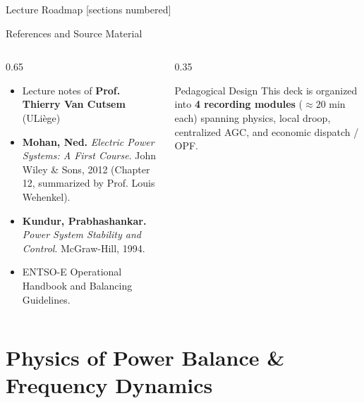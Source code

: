 
\titleframe

\begin{frame}{Lecture Roadmap}
  [sections numbered]
  \tableofcontents[hideallsubsections]
\end{frame}

\begin{frame}{References and Source Material}
\begin{columns}[T]
\begin{column}{0.65\textwidth}
    \begin{itemize}\setlength{\itemsep}{4pt}
      \item Lecture notes of \textbf{Prof. Thierry Van Cutsem} (ULiège)
      \item \textbf{Mohan, Ned.} \textit{Electric Power Systems: A First Course}. John Wiley \& Sons, 2012 (Chapter 12, summarized by Prof. Louis Wehenkel).
      \item \textbf{Kundur, Prabhashankar.} \textit{Power System Stability and Control}. McGraw-Hill, 1994.
      \item ENTSO-E Operational Handbook and Balancing Guidelines.
    \end{itemize}
\end{column}
\begin{column}{0.35\textwidth}
    \begin{block}{Pedagogical Design}
    \scriptsize
    This deck is organized into \textbf{4 recording modules} ($\approx 20\text{ min}$ each) spanning physics, local droop, centralized AGC, and economic dispatch / OPF.
    \end{block}
\end{column}
\end{columns}
\end{frame}

\section{Physics of Power Balance \& Frequency Dynamics}


